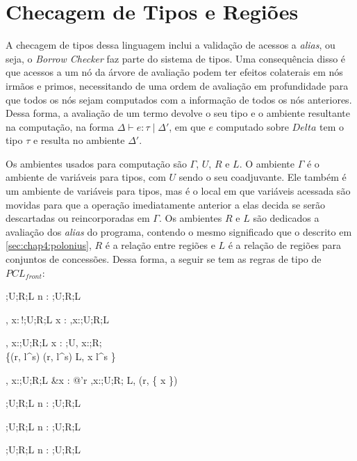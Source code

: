 \section{Checagem de Tipos e Regiões}

A checagem de tipos dessa linguagem inclui a validação de acessos a \emph{alias}, ou seja, o \emph{Borrow Checker} faz parte do sistema de tipos. Uma consequência disso é que acessos a um nó da árvore de avaliação podem ter efeitos colaterais em nós irmãos e primos, necessitando de uma ordem de avaliação em profundidade para que todos os nós sejam computados com a informação de todos os nós anteriores. Dessa forma, a avaliação de um termo devolve o seu tipo e o ambiente resultante na computação, na forma $\Delta \vdash e : \tau\;|\;\Delta'$, em que $e$ computado sobre $Delta$ tem o tipo $\tau$ e resulta no ambiente $\Delta'$.

Os ambientes usados para computação são $\Gamma$, $U$, $R$ e $L$. O ambiente $\Gamma$ é o ambiente de variáveis para tipos, com $U$ sendo o seu coadjuvante. Ele também é um ambiente de variáveis para tipos, mas é o local em que variáveis acessada são movidas para que a operação imediatamente anterior a elas decida se serão descartadas ou reincorporadas em $\Gamma$. Os ambientes $R$ e $L$ são dedicados a avaliação dos \emph{alias} do programa, contendo o mesmo significado que o descrito em \ref{sec:chap4:polonius}, $R$ é a relação entre regiões e $L$ é a relação de regiões para conjuntos de concessões. Dessa forma, a seguir se tem as regras de tipo de $PCL_{front}$:

\infrule[Number]
	{}
	{\Gamma;U;R;L \vdash n :  \OR \Gamma;U;R;L} 

	{\Gamma, x:\,!\tau;U;R;L \vdash x : \tau \OR \Gamma,x:\tau;U;R;L} 

	{\Gamma, x:\tau;U;R;L \vdash x : \tau \OR \Gamma;U, x:\tau;R; \\
	\{(r, l^s) \OR \forall (r, l^s) \in L, x \notin l^s \} }

	{\Gamma, x:\tau;U;R;L \vdash \&x : @\tau'r \OR \Gamma,x:\tau;U;R;
	L, (r, \{ x \})}

	{\Gamma;U;R;L \vdash n :  \OR \Gamma;U;R;L} 

	{\Gamma;U;R;L \vdash n :  \OR \Gamma;U;R;L} 

	{\Gamma;U;R;L \vdash n :  \OR \Gamma;U;R;L} 

